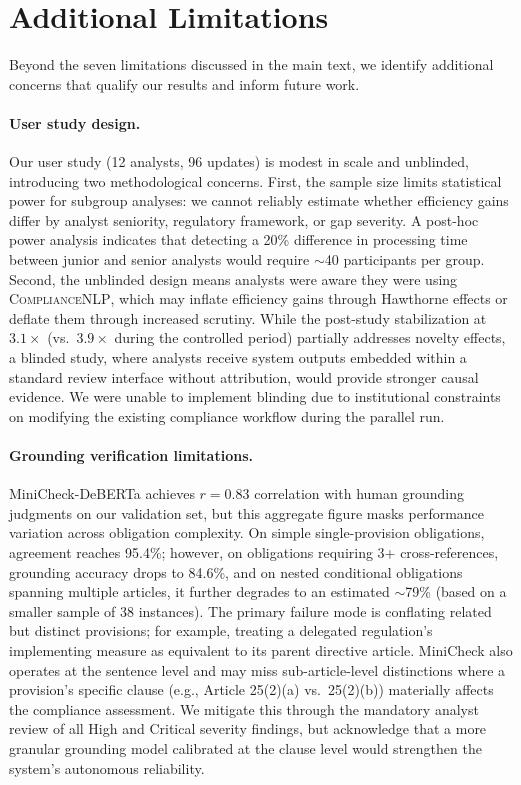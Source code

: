\documentclass[11pt]{article}
\begin{document}
\section{Additional Limitations}
\label{app:limitations}

Beyond the seven limitations discussed in the main text, we identify additional concerns that qualify our results and inform future work.

\paragraph{User study design.} Our user study (12 analysts, 96 updates) is modest in scale and unblinded, introducing two methodological concerns. First, the sample size limits statistical power for subgroup analyses: we cannot reliably estimate whether efficiency gains differ by analyst seniority, regulatory framework, or gap severity. A post-hoc power analysis indicates that detecting a 20\% difference in processing time between junior and senior analysts would require $\sim$40 participants per group. Second, the unblinded design means analysts were aware they were using \textsc{ComplianceNLP}, which may inflate efficiency gains through Hawthorne effects or deflate them through increased scrutiny. While the post-study stabilization at $3.1\times$ (vs.\ $3.9\times$ during the controlled period) partially addresses novelty effects, a blinded study, where analysts receive system outputs embedded within a standard review interface without attribution, would provide stronger causal evidence. We were unable to implement blinding due to institutional constraints on modifying the existing compliance workflow during the parallel run.

\paragraph{Grounding verification limitations.} MiniCheck-DeBERTa achieves $r{=}0.83$ correlation with human grounding judgments on our validation set, but this aggregate figure masks performance variation across obligation complexity. On simple single-provision obligations, agreement reaches 95.4\%; however, on obligations requiring 3+ cross-references, grounding accuracy drops to 84.6\%, and on nested conditional obligations spanning multiple articles, it further degrades to an estimated $\sim$79\% (based on a smaller sample of 38 instances). The primary failure mode is conflating related but distinct provisions; for example, treating a delegated regulation's implementing measure as equivalent to its parent directive article. MiniCheck also operates at the sentence level and may miss sub-article-level distinctions where a provision's specific clause (e.g., Article 25(2)(a) vs.\ 25(2)(b)) materially affects the compliance assessment. We mitigate this through the mandatory analyst review of all High and Critical severity findings, but acknowledge that a more granular grounding model calibrated at the clause level would strengthen the system's autonomous reliability.
\end{document}
